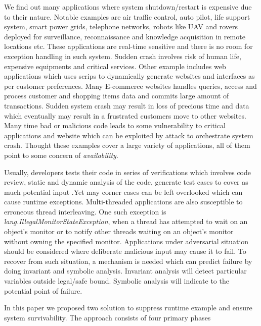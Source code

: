 We find out many applications where system shutdown/restart is expensive due to
their nature.
Notable examples are air traffic control, auto pilot, life support system, smart
power grids, telephone networks, robots like UAV and rovers deployed for
surveillance, reconnaissance and knowledge acquisition in remote locations etc.
These applications are real-time sensitive and there is no room for exception
handling in such system.
Sudden crash involves risk of human life, expensive equipments and critical
services.
Other example includes web applications which uses scrips to dynamically
generate websites and interfaces as per customer preferences.
Many E-commerce websites handles queries, access and process customer and
shopping items data and commits large amount of transactions.
Sudden system crash may result in loss of precious time and data which
eventually may result in a frustrated customers move to other websites.
Many time bad or malicious code leads to some vulnerability to critical
applications and website which can be exploited by attack to orchestrate system
crash. Thought these examples cover a large variety of applications, all of them
point to some concern of \emph{availability}.

Usually, developers tests their code in series of verifications which involves
code review, static and dynamic analysis of the code, generate test cases to
cover as much potential input .Yet may corner cases can be left overlooked which
can cause runtime exceptions.
Multi-threaded applications are also susceptible to erroneous thread
interleaving. One such exception is
\emph{\java\.lang.IllegalMonitorStateException}, when a thread has attempted to
wait on an object's monitor or to notify other threads waiting on an object's
monitor without owning the specified monitor. Applications under adversarial
situation should be considered where deliberate malicious input may cause it to
fail. To recover from such situation, a mechanism is needed which can predict
failure by doing invariant and symbolic analysis. Invariant analysis will detect
particular variables outside legal/safe bound. Symbolic analysis will indicate
to the potential point of failure.


In this paper we proposed two solution to suppress runtime example and ensure
system survivability. The approach consists of four primary phases


